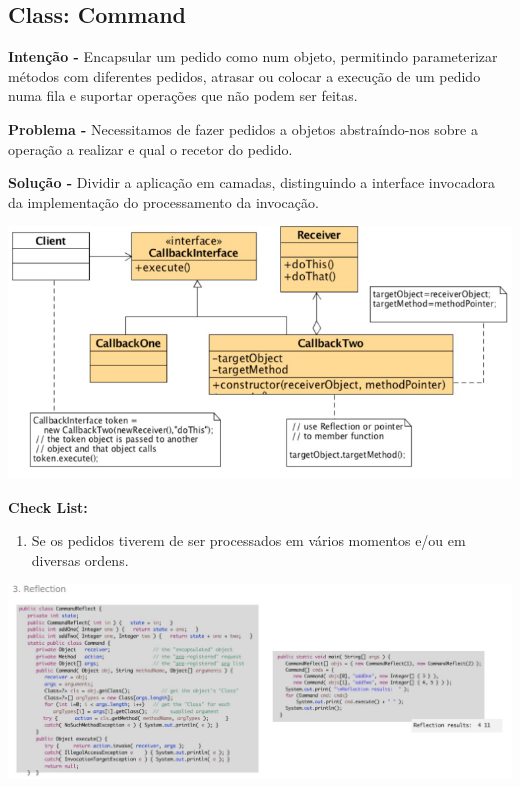 \documentclass{article}
\begin{document}
\subsection{Class: Command}

\begin{flushleft}
    \textbf{Intenção -} Encapsular um pedido como num objeto, permitindo parameterizar métodos com
    diferentes pedidos, atrasar ou colocar a execução de um pedido numa fila e suportar
    operações que não podem ser feitas.
\end{flushleft}

\begin{flushleft}
    \textbf{Problema -} Necessitamos de fazer pedidos a objetos abstraíndo-nos sobre a operação a realizar
    e qual o recetor do pedido.
\end{flushleft}

\begin{flushleft}
    \textbf{Solução -} Dividir a aplicação em camadas, distinguindo a interface invocadora da
    implementação do processamento da invocação.
\end{flushleft}

\begin{center}
    \includegraphics[scale=0.35]{Images/60.png}
\end{center}

\begin{flushleft}
    \textbf{Check List:}

    \begin{enumerate}
        \item Se os pedidos tiverem de ser processados em vários momentos e/ou em diversas
        ordens.
    \end{enumerate}
\end{flushleft}

\begin{center}
    \includegraphics[scale=0.35]{Images/61.png}
\end{center}
\end{document}
